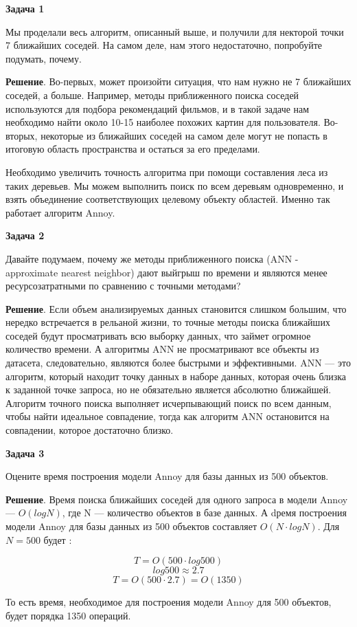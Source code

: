 \textbf{Задача 1}

Мы проделали весь алгоритм, описанный выше, и получили для некторой точки 7 ближайших соседей. На самом деле, нам этого недостаточно, попробуйте подумать, почему. 

\textbf{Решение}. Во-первых, может произойти ситуация, что нам нужно не 7 ближайших соседей, а больше.  Например, методы приближенного поиска соседей используются для подбора рекомендаций фильмов, и в такой задаче нам необходимо найти около 10-15 наиболее похожих картин для пользователя. 
Во-вторых, некоторые из ближайших соседей на самом деле могут не попасть в итоговую область пространства и остаться за его пределами. 

Необходимо увеличить точность алгоритма при помощи составления леса из таких деревьев. Мы можем выполнить поиск по всем деревьям одновременно, и взять объединение соответствующих целевому объекту областей. Именно так работает алгоритм Annoy. 

\textbf{Задача 2}

Давайте подумаем, почему же методы приближенного поиска (ANN - approximate nearest neighbor) дают выйгрыш по времени и являются менее ресурсозатратными по сравнению с точными методами?

\textbf{Решение}. Если объем анализируемых данных становится слишком большим, что нередко встречается в рельаной жизни, то точные методы поиска ближайших соседей будут просматривать всю выборку данных, что займет огромное количество времени. А алгоритмы ANN не просматривают все объекты из датасета, следовательно, являются более быстрыми и эффективными. ANN — это алгоритм, который находит точку данных в наборе данных, которая очень близка к заданной точке запроса, но не обязательно является абсолютно ближайшей. Алгоритм точного поиска выполняет исчерпывающий поиск по всем данным, чтобы найти идеальное совпадение, тогда как алгоритм ANN остановится на совпадении, которое достаточно близко.

\textbf{Задача 3}

Оцените время построения модели Annoy для базы данных из 500 объектов.

\textbf{Решение}. Время поиска ближайших соседей для одного запроса в модели Annoy — $O(logN)$, где N — количество объектов в базе данных. А dремя построения модели Annoy для базы данных из 500 объектов составляет $O(N\cdot logN)$. Для $N = 500$ будет :

\[
    T = O(500 \cdot log500) 
\]
\[
    log500 \approx 2.7 
\]
\[
    T = O(500 \cdot 2.7) = O(1350)
\]

То есть время, необходимое для построения модели Annoy для 500 объектов, будет порядка 1350 операций.
